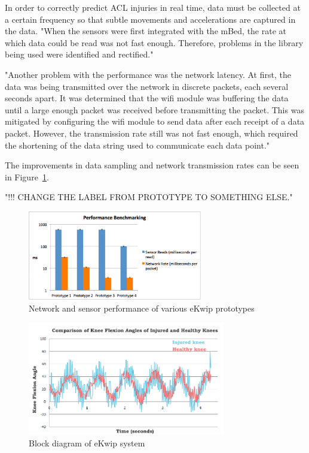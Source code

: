In order to correctly predict ACL injuries in real time, data must be collected at a certain frequency so that subtle movements and accelerations are captured in the data. "When the sensors were first integrated with the mBed, the rate at which data could be read was not fast enough. Therefore, problems in the library being used were identified and rectified."

"Another problem with the performance was the network latency. At first, the data was being transmitted over the network in discrete packets, each several seconds apart. It was determined that the wifi module was buffering the data until a large enough packet was received before transmitting the packet. This was mitigated by configuring the wifi module to send data after each receipt of a data packet. However, the transmission rate still was not fast enough, which required the shortening of the data string used to communicate each data point."

The improvements in data sampling and network transmission rates can be seen in Figure~\ref{fig:graph}.

"!!! CHANGE THE LABEL FROM PROTOTYPE TO SOMETHING ELSE."

\begin{figure}[h]
  \begin{center}
    \includegraphics[width=3in]{images/graph.png}
  \end{center}
  \caption{Network and sensor performance of various eKwip prototypes}
  \label{fig:graph}
\end{figure}






\begin{figure}[h]
  \begin{center}
    \includegraphics[width=3.4in]{images/results_graph.PNG}
  \end{center}
  \caption{Block diagram of eKwip system}
  \label{fig:results_graph}
\end{figure}